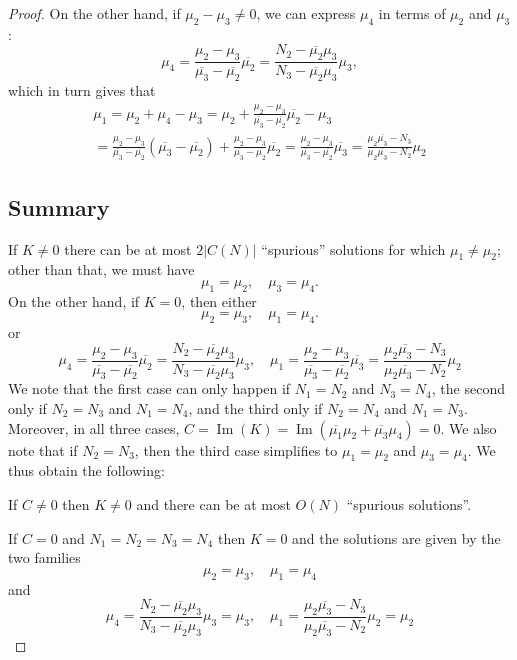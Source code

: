 \documentclass[12pt]{amsart}
\theoremstyle{plain}
\newcommand{\torus}{C(N)} %
\newcommand{\im}{\operatorname{Im}}
\renewcommand{\^}{\widehat}
\begin{document}
\begin{proof}
On the other hand, if $\mu_2  - \mu_3 \neq 0$, we can express 
$\mu_4$ in terms of $\mu_2$ and $\mu_3$:
$$
\mu_4 
=
\frac{\mu_2  - \mu_3}
{\overline{\mu_3} -\overline{\mu_2}}
\overline{\mu_2}
=
\frac{N_2  - \overline{\mu_2}\mu_3}
{N_3 - \overline{\mu_2}\mu_3}
\mu_3,
$$
which in turn gives that
\begin{multline}
  \label{eq:non-diag-sol}
\mu_1  = \mu_2 + \mu_4 - \mu_3
=
\mu_2 +
\frac{\mu_2  - \mu_3}
{\overline{\mu_3} -\overline{\mu_2}}
\overline{\mu_2}
- \mu_3
\\
=
\frac{\mu_2 - \mu_3}{\overline{\mu_3} -\overline{\mu_2}}
(\overline{\mu_3} -\overline{\mu_2})
+
\frac{\mu_2  - \mu_3}
{\overline{\mu_3} -\overline{\mu_2}}
\overline{\mu_2}
=
\frac{\mu_2  - \mu_3}
{\overline{\mu_3} -\overline{\mu_2}}
\overline{\mu_3}
=
\frac{\mu_2 \overline{\mu_3}  - N_3}
{\mu_2 \overline{\mu_3} - N_2}
\mu_2
\end{multline}

\subsection*{Summary}
If $K \neq 0$  there can be at most $2|\torus|$ ``spurious'' solutions
for which  $\mu_1 \neq \mu_2$; other than that, we must have
$$
\mu_1 = \mu_2,  \quad
\mu_3=\mu_4.
$$
%
On the other hand, if $K=0$, then either 
$$
\mu_2 = \mu_3,  \quad
\mu_1=\mu_4.
$$
or 
$$
\mu_4 
=
\frac{\mu_2  - \mu_3}
{\overline{\mu_3} -\overline{\mu_2}}
\overline{\mu_2}
=
\frac{N_2  - \overline{\mu_2}\mu_3}
{N_3 - \overline{\mu_2}\mu_3}
\mu_3,
\quad
\mu_1 =
\frac{\mu_2  - \mu_3}
{\overline{\mu_3} -\overline{\mu_2}}
\overline{\mu_3}
=
\frac{\mu_2 \overline{\mu_3}  - N_3}
{\mu_2 \overline{\mu_3} - N_2}
\mu_2
$$
%
We note that the first case can only happen if $N_1=N_2$ and
$N_3=N_4$, the second only if $N_2=N_3$ and $N_1=N_4$, and the third
only if $N_2=N_4$ and $N_1=N_3$.  Moreover, in all three cases,
$C=\im(K)= \im(\overline{\mu_1} \mu_2 + \overline{\mu_3}\mu_4 
) = 0$.  We also note that if $N_2=N_3$, then 
the third case simplifies to $\mu_1=\mu_2$ and
$\mu_3=\mu_4$.  We thus obtain the following:

If $C\neq 0$ then $K\neq 0$ and there can be at most $O(N)$
``spurious solutions''.  

If $C=0$ and $N_1=N_2=N_3=N_4$ then $K=0$ and the solutions are given
by the two families
$$
\mu_2 = \mu_3,  \quad
\mu_1=\mu_4
$$
and 
$$
\mu_4 
=
\frac{N_2  - \overline{\mu_2}\mu_3}
{N_3 - \overline{\mu_2}\mu_3}
\mu_3
= \mu_3,
\quad
\mu_1 
=
\frac{\mu_2 \overline{\mu_3}  - N_3}
{\mu_2 \overline{\mu_3} - N_2}
\mu_2
=
\mu_2
$$



\end{proof}
\end{document}
